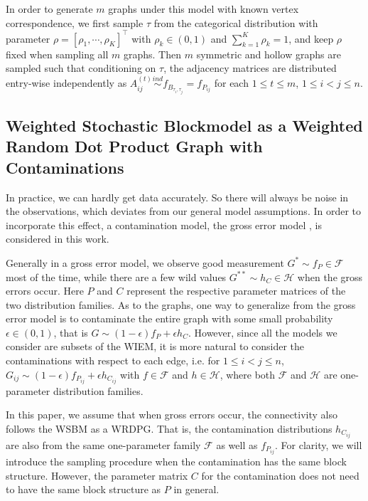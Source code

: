 \documentclass[a4paper]{article}
\begin{document}
In order to generate $m$ graphs under this model with known vertex correspondence, we first sample $\tau$ from the categorical distribution with parameter $\rho = [\rho_1, \cdots, \rho_K]^{\top}$ with $\rho_k \in (0, 1)$ and $\sum_{k = 1}^{K} \rho_k = 1$, and keep $\rho$ fixed when sampling all $m$ graphs. Then $m$ symmetric and hollow graphs are sampled such that conditioning on $\tau$, the adjacency matrices are distributed entry-wise independently as $A^{(t)}_{ij} \stackrel{ind}{\sim} f_{B_{\tau_i, \tau_j}} = f_{P_{ij}}$ for each $1 \le t \le m$, $1 \le i < j \le n$.




\subsection{Weighted Stochastic Blockmodel as a Weighted Random Dot Product Graph with Contaminations}
\label{section:Contamination}

In practice, we can hardly get data accurately. So there will always be noise in the observations, which deviates from our general model assumptions. In order to incorporate this effect, a contamination model, the gross error model \citep{AIC:AIC690280519, bickel2001mathematical}, is considered in this work.

Generally in a gross error model, we observe good measurement $G^* \sim f_P \in \mathcal{F}$ most of the time, while there are a few wild values $G^{**} \sim h_C \in \mathcal{H}$ when the gross errors occur. Here $P$ and $C$ represent the respective parameter matrices of the two distribution families.
As to the graphs, one way to generalize from the gross error model is to contaminate the entire graph with some small probability $\epsilon \in (0, 1)$, that is $G \sim (1-\epsilon) f_P + \epsilon h_C$. However, since all the models we consider are subsets of the WIEM, it is more natural to consider the contaminations with respect to each edge, i.e. for $1 \le i <  j \le n$, $G_{ij} \sim (1-\epsilon) f_{P_{ij}} + \epsilon h_{C_{ij}}$ with $f \in \mathcal{F}$ and $h \in \mathcal{H}$, where both $\mathcal{F}$ and $\mathcal{H}$ are one-parameter distribution families.

In this paper, we assume that when gross errors occur, the connectivity also follows the WSBM as a WRDPG. That is, the contamination distributions $h_{C_{ij}}$ are also from the same one-parameter family $\mathcal{F}$ as well as $f_{P_{ij}}$. For clarity, we will introduce the sampling procedure when the contamination has the same block structure. However, the parameter matrix $C$ for the contamination does not need to have the same block structure as $P$ in general.
\end{document}
